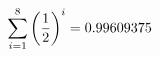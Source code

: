 \documentclass[preview]{standalone}
\begin{document}
\begin{align*}
\sum_{i=1}^{ 8 } \left({ 1 } \over {2} \right)^i = { 0.99609375 }
\end{align*}
\end{document}
